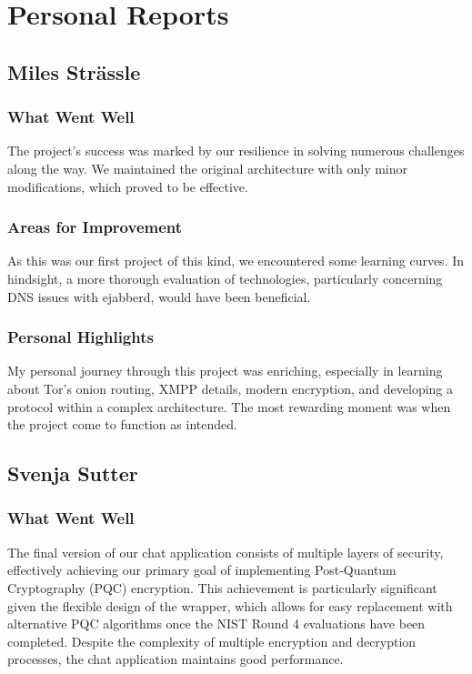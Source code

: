 \chapter{Personal Reports}

\section{Miles Strässle}
\subsection{What Went Well}
The project's success was marked by our resilience in solving numerous challenges along the way. We maintained the original architecture with only minor modifications, which proved to be effective.

\subsection{Areas for Improvement}
As this was our first project of this kind, we encountered some learning curves. In hindsight, a more thorough evaluation of technologies, particularly concerning DNS issues with ejabberd, would have been beneficial.

\subsection{Personal Highlights}
My personal journey through this project was enriching, especially in learning about Tor's onion routing, XMPP details, modern encryption, and developing a protocol within a complex architecture. The most rewarding moment was when the project come to function as intended.



\section{Svenja Sutter}
\subsection{What Went Well}
The final version of our chat application consists of multiple layers of security, effectively achieving our primary goal of implementing Post-Quantum Cryptography (PQC) encryption. This achievement is particularly significant given the flexible design of the wrapper, which allows for easy replacement with alternative PQC algorithms once the NIST Round 4 evaluations have been completed. Despite the complexity of multiple encryption and decryption processes, the chat application maintains good performance.

